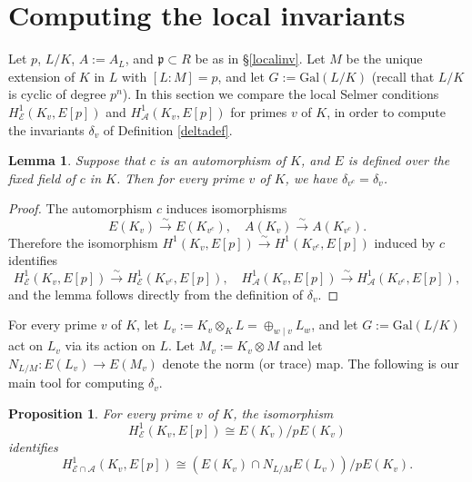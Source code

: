 \documentclass[reqno]{amsart}
\newtheorem{lem}[thm]{Lemma}
\newtheorem{prop}[thm]{Proposition}
\theoremstyle{definition}
\def\A{\mathcal{A}}
\def\E{\mathcal{E}}
\def\p{\mathfrak{p}}
\def\Gal{\mathrm{Gal}}
\def\isom{\xrightarrow{\sim}}
\def\Hs#1{H^1_{#1}}
\def\HE{\Hs{\E}}
\def\HA{\Hs{\A}}
\begin{document}
\section{Computing the local invariants}
\label{loc}

Let $p$, $L/K$, $A := A_L$, and $\p \subset R$ be as in \S\ref{localinv}.  
Let $M$ be the unique extension of $K$ in $L$ with $[L:M] = p$, and
let $G := \Gal(L/K)$ (recall that $L/K$ is cyclic of degree $p^n$).  
In this section we compare the local Selmer conditions 
$\HE(K_v,E[p])$ and $\HA(K_v,E[p])$ for primes $v$ of $K$, in order to 
compute the invariants $\delta_v$ of Definition \ref{deltadef}.  

\begin{lem}
\label{par2}
Suppose that $c$ is an automorphism of $K$, and $E$ is defined over 
the fixed field of $c$ in $K$.  
Then for every prime $v$ of $K$, we have $\delta_{v^c} = \delta_v$.
\end{lem}

\begin{proof}
The automorphism $c$ induces isomorphisms 
$$
E(K_v) \isom E(K_{v^c}), \quad A(K_v) \isom A(K_{v^c}).
$$ 
Therefore the 
isomorphism $H^1(K_v,E[p]) \isom H^1(K_{v^c},E[p])$ induced by $c$ identifies 
$$
\HE(K_v,E[p]) \isom \HE(K_{v^c},E[p]), \quad \HA(K_v,E[p]) \isom \HA(K_{v^c},E[p]),
$$
and the lemma follows directly from the definition of $\delta_v$.
\end{proof}

For every prime $v$ of $K$, 
let $L_v := K_v \otimes_K L = \oplus_{w \mid v} L_w$, and let $G:=\Gal(L/K)$ act on 
$L_v$ via its action on $L$.  Let $M_v := K_v \otimes M$ and let 
$N_{L/M} : E(L_v) \to E(M_v)$ denote the norm (or trace) map.  
The following is our main tool for computing $\delta_v$.

\begin{prop}
\label{newint}
For every prime $v$ of $K$, the isomorphism $$\HE(K_v,E[p]) \cong E(K_v)/p E(K_v)$$ 
identifies 
$$
\Hs{\E\cap\A}(K_v,E[p]) \cong (E(K_v) \cap N_{L/M}E(L_v))/p E(K_v).
$$
\end{prop}
\end{document}
